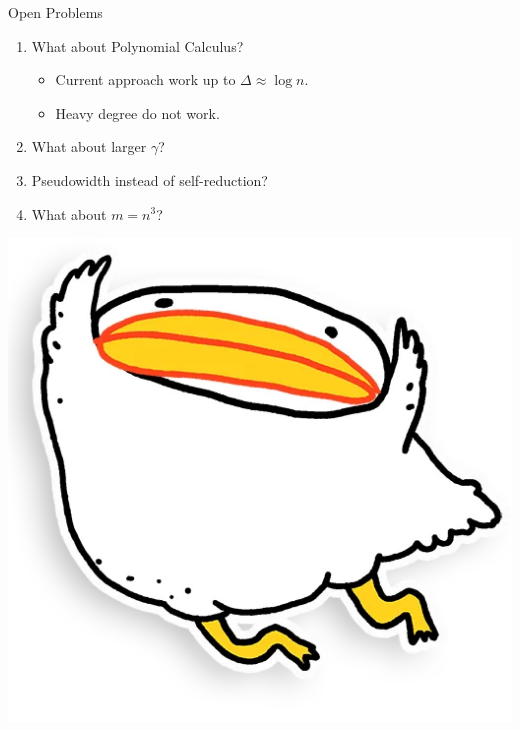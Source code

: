 \begin{frame}{Open Problems}

    \begin{enumerate}
        \item What about Polynomial Calculus?
            \begin{itemize}
                \item Current approach work up to $\Delta \approx \log n$.
                \item Heavy degree do not work.
            \end{itemize}
            \pause
        \item What about larger $\gamma$?
            \pause
        \item Pseudowidth instead of self-reduction?
            \pause
        \item What about $m = n^3$?
    \end{enumerate}

    \pause
    \vspace{0.5cm}
    \begin{center}
        \includegraphics[scale = 0.2]{pics/utia-fly.png}        
    \end{center}

\end{frame}